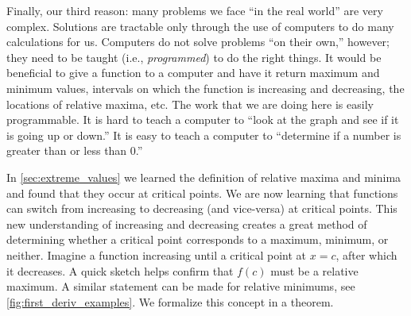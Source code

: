 Finally, our third reason: many problems we face ``in the real world'' are very complex. Solutions are tractable only through the use of computers to do many calculations for us. Computers do not solve problems ``on their own,'' however; they need to be taught (i.e., \emph{programmed}) to do the right things. It would be beneficial to give a function to a computer and have it return maximum and minimum values, intervals on which the function is increasing and decreasing, the locations of relative maxima, etc. The work that we are doing here is easily programmable. It is hard to teach a computer to ``look at the graph and see if it is going up or down.'' It is easy to teach a computer to ``determine if a number is greater than or less than 0.''

In \autoref{sec:extreme_values} we learned the definition of relative maxima and minima and found that they occur at critical points. We are now learning that functions can switch from increasing to decreasing (and vice-versa) at critical points. This new understanding of increasing and decreasing creates a great method of determining whether a critical point corresponds to a maximum, minimum, or neither. Imagine a function increasing until a critical point at $x=c$, after which it decreases. A quick sketch helps confirm that $f(c)$ must be a relative maximum. A similar statement can be made for relative minimums, see \autoref{fig:first_deriv_examples}. We formalize this concept in a theorem.

